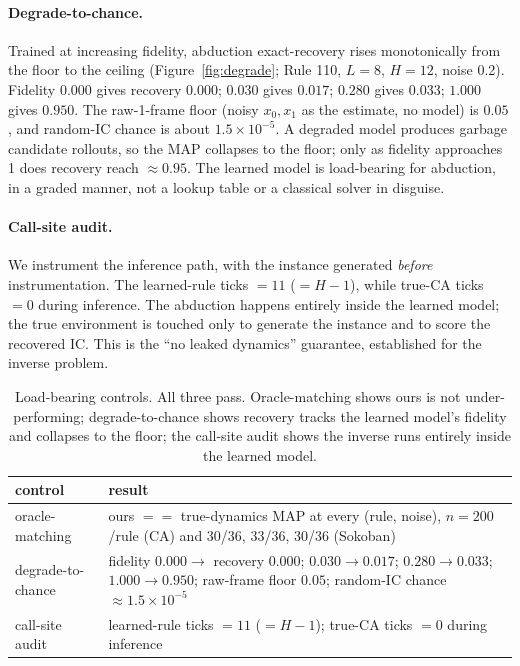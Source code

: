 \documentclass{article}
\begin{document}
\paragraph{Degrade-to-chance.}
Trained at increasing fidelity, abduction exact-recovery rises monotonically from the floor to the
ceiling (Figure~\ref{fig:degrade}; Rule 110, $L=8$, $H=12$, noise 0.2). Fidelity $0.000$ gives
recovery $0.000$; $0.030$ gives $0.017$; $0.280$ gives $0.033$; $1.000$ gives $0.950$. The
raw-1-frame floor (noisy $x_0,x_1$ as the estimate, no model) is $0.05$, and random-IC chance is
about $1.5\times10^{-5}$. A degraded model produces garbage candidate rollouts, so the MAP collapses
to the floor; only as fidelity approaches 1 does recovery reach $\approx 0.95$. The learned model is
load-bearing for abduction, in a graded manner, not a lookup table or a classical solver in disguise.

\paragraph{Call-site audit.}
We instrument the inference path, with the instance generated \emph{before} instrumentation. The
learned-rule ticks $= 11$ ($= H-1$), while true-CA ticks $= 0$ during inference. The abduction happens
entirely inside the learned model; the true environment is touched only to generate the instance and
to score the recovered IC. This is the ``no leaked dynamics'' guarantee, established for the inverse
problem.

\begin{table}[t]
\centering
\caption{Load-bearing controls. All three pass. Oracle-matching shows ours is not
under-performing; degrade-to-chance shows recovery tracks the learned model's fidelity and
collapses to the floor; the call-site audit shows the inverse runs entirely inside the
learned model.}
\label{tab:controls}
\begin{tabular}{@{}lp{9.6cm}@{}}
\toprule
control & result \\
\midrule
oracle-matching & ours $==$ true-dynamics MAP at every (rule, noise), $n=200$/rule (CA) and 30/36, 33/36, 30/36 (Sokoban) \\
\addlinespace
degrade-to-chance & fidelity $0.000 \rightarrow$ recovery $0.000$; $0.030 \rightarrow 0.017$; $0.280 \rightarrow 0.033$; $1.000 \rightarrow 0.950$; raw-frame floor $0.05$; random-IC chance $\approx 1.5\times10^{-5}$ \\
\addlinespace
call-site audit & learned-rule ticks $= 11$ ($= H-1$); true-CA ticks $= 0$ during inference \\
\bottomrule
\end{tabular}
\end{table}
\end{document}
